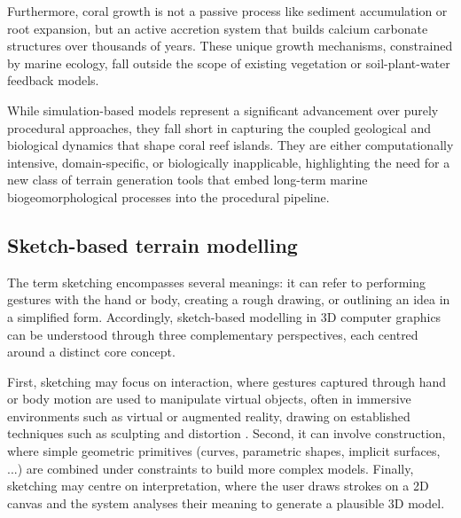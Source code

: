 Furthermore, coral growth is not a passive process like sediment accumulation or root expansion, but an active accretion system that builds calcium carbonate structures over thousands of years. These unique growth mechanisms, constrained by marine ecology, fall outside the scope of existing vegetation or soil-plant-water feedback models.

\midConclusion

While simulation-based models represent a significant advancement over purely procedural approaches, they fall short in capturing the coupled geological and biological dynamics that shape coral reef islands. They are either computationally intensive, domain-specific, or biologically inapplicable, highlighting the need for a new class of terrain generation tools that embed long-term marine biogeomorphological processes into the procedural pipeline.







\subsection{Sketch-based terrain modelling}
\label{sec:coral-island-sota-sketches}

The term sketching encompasses several meanings: it can refer to performing gestures with the hand or body, creating a rough drawing, or outlining an idea in a simplified form. Accordingly, sketch-based modelling in 3D computer graphics can be understood through three complementary perspectives, each centred around a distinct core concept.

First, sketching may focus on interaction, where gestures captured through hand or body motion are used to manipulate virtual objects, often in immersive environments such as virtual or augmented reality, drawing on established techniques such as sculpting and distortion \cite{Olsen2009, Cook2009}. Second, it can involve construction, where simple geometric primitives (curves, parametric shapes, implicit surfaces, ...) are combined under constraints to build more complex models. Finally, sketching may centre on interpretation, where the user draws strokes on a 2D canvas and the system analyses their meaning to generate a plausible 3D model.


